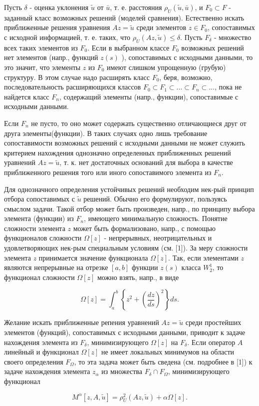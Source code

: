 \documentclass[10pt]{article}
\begin{document}
Пусть $\delta$ - оценка уклонения $\tilde{u}$ от $\bar{u}$, т. е. расстояния $\rho_{U}(\tilde{u}, \bar{u})$, и $F_{0} \subset F$ - заданный класс возможных решений (моделей сравнения). Естественно искать приближенные решения уравнения $A z=\tilde{u}$ среди элементов $z \in F_{0}$, сопоставимых с исходной информацией, т. е. таких, что $\rho_{U}(A z, \tilde{u}) \leqslant \delta$. Пусть $F_{\delta}$ - множество всех таких элементов из $F_{0}$. Если в выбранном классе $F_{0}$ возможных решений нет элементов (напр., функций $z(s)$ ), сопоставимых с исходными данными, то это значит, что элементы $z$ из $F_{0}$ имеют слишком упрощенную (грубую) структуру. В этом случае надо расширять класс $F_{0}$, беря, возможно, последовательность расширяющихся классов $F_{0} \subset F_{1} \subset \ldots \subset F_{n} \subset \ldots$, пока не найдется класс $F_{n}$, содержащий элементы (напр., функции), сопоставимые с исходными данными.



Если $F_{n}$ не пусто, то оно может содержать существенно отличающиеся друг от друга элементы(функции). В таких случаях одно лишь требование сопоставимости возможных решений с исходными данными не может служить критерием нахождения однозначно определенных приближенных решений уравнений $A z=\tilde{u}$, т. к. нет достаточных оснований для выбора в качестве приближенного решения того или иного сопоставимого элемента из $F_{n}$.



Для однозначного определения устойчивых решений необходим нек-рый принцип отбора сопоставимых с $\tilde{u}$ решений. Обычно его формулируют, пользуясь смыслом задачи. Такой отбор может быть произведен, напр., по принципу выбора элемента (функции) из $F_{n}$, имеющего минимальную сложность. Понятие сложности элемента $z$ может быть формализовано, напр., с помощью функционалов сложности $\Omega[z]$ - непрерывных, неотрицательных и удовлетворяющих нек-рым специальным условиям (см. [1]). За меру сложности элемента $z$ принимается значение функционала $\Omega[z]$. Так, если элементами $z$ являются непрерывные на отрезке $[a, b]$ функции $z(s)$ класса $W_{2}^{1}$, то функционал сложности $\Omega[z]$ можно взять, напр., в виде



\[

\Omega[z]=\int_{a}^{b}\left\{z^{2}+\left(\frac{d z}{d s}\right)^{2}\right\} d s .

\]



Желание искать приближенные репения уравнений $A z=\tilde{u}$ среди простейших элементов (функций), сопоставимых с исходными данными, приводит к задаче нахождения элемента из $F_{\delta}$, минимизирующего $\Omega[z]$ на $F_{\delta}$. Если оператор $A$ линейный и функционал $\Omega[z]$ не имеет локальных минимумов на области своего определения $F_{\Omega}$, то эта задача может быть сведена (см. подробнее в [1]) к задаче нахождения элемента $z_{\alpha}$ из множества $F_{\delta} \cap F_{\Omega}$, минимизирующего функционал



\[

M^{\alpha}[z, A, \tilde{u}]=\rho_{U}^{2}(A z, \tilde{u})+\alpha \Omega[z] .

\]
\end{document}
